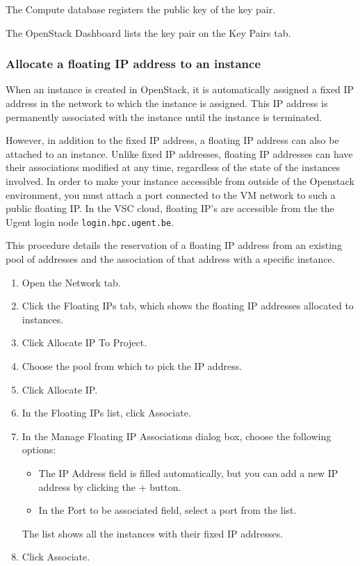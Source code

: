 The Compute database registers the public key of the key pair.

The \gls{OpenStack Dashboard} lists the key pair on the Key Pairs tab.

\subsubsection{Allocate a floating IP address to an instance}\label{allocate-a-floating-ip-address-to-an-instance}
When an instance is created in \gls{OpenStack}, it is automatically
assigned a fixed IP address in the network to which the instance is
assigned. This IP address is permanently associated with the instance
until the instance is terminated.

However, in addition to the fixed IP address, a floating IP address
can also be attached to an instance.  Unlike fixed IP addresses,
floating IP addresses can have their associations modified at any
time, regardless of the state of the instances involved.  In order to
make your instance accessible from outside of the Openstack
environment, you must attach a port connected to the VM network to
such a public floating IP.  In the VSC cloud, floating IP's are
accessible from the the Ugent login node
\lstinline{login.hpc.ugent.be}.

This procedure details the reservation of a floating IP address from
an existing pool of addresses and the association of that address with
a specific instance.

\begin{enumerate}
\item Open the Network tab.
\item Click the Floating IPs tab, which shows the floating IP
  addresses allocated to instances.
\item Click Allocate IP To Project.
\item Choose the pool from which to pick the IP address.
\item Click Allocate IP.
\item In the Floating IPs list, click Associate.
\item In the Manage Floating IP Associations dialog box, choose the
  following options:

  \begin{itemize}
  \item The IP Address field is filled automatically, but you can add
    a new IP address by clicking the + button.
  \item In the Port to be associated field, select a port from the
    list.
  \end{itemize}

  The list shows all the instances with their fixed IP addresses.
\item Click Associate.
\end{enumerate}

